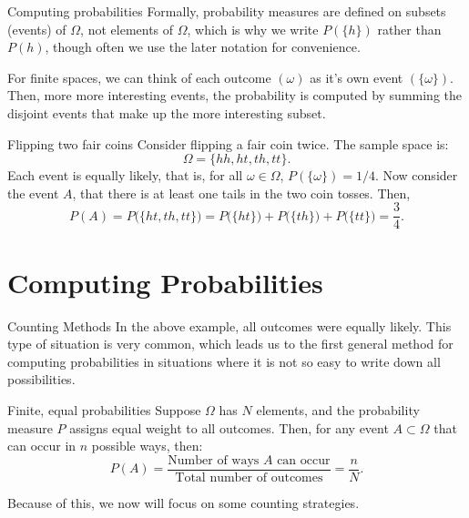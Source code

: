 \begin{frame}[allowframebreaks]{Computing probabilities}
  Formally, probability measures are defined on subsets (events) of $\Omega$, not elements of $\Omega$, which is why we write $P(\{h\})$ rather than $P(h)$, though often we use the later notation for convenience.
  
  For finite spaces, we can think of each outcome $(\omega)$ as it's own event $(\{\omega\})$. Then, more more interesting events, the probability is computed by summing the disjoint events that make up the more interesting subset.
  
  \begin{exampleblock}{Flipping two fair coins}
    Consider flipping a fair coin twice. The sample space is:
    $$
    \Omega = \{hh, ht, th, tt\}.
    $$
    Each event is equally likely, that is, for all $\omega \in \Omega$, $P(\{\omega\}) = 1/4$. Now consider the event $A$, that there is at least one tails in the two coin tosses. Then, 
    $$
    P(A) = P\big(\{ht, th, tt\}\big) = P\big(\{ht\}\big) + P\big(\{th\}\big) + P\big(\{tt\}\big) = \frac{3}{4}.
    $$
  \end{exampleblock}
\end{frame}

\section{Computing Probabilities}

\begin{frame}{Counting Methods}
  In the above example, all outcomes were equally likely. This type of situation is very common, which leads us to the first general method for computing probabilities in situations where it is not so easy to write down all possibilities.
  \begin{block}{Finite, equal probabilities}
    Suppose $\Omega$ has $N$ elements, and the probability measure $P$ assigns equal weight to all outcomes. Then, for any event $A \subset \Omega$ that can occur in $n$ possible ways, then:
    $$
    P(A) = \frac{\text{Number of ways } A \text{ can occur}}{\text{Total number of outcomes}} = \frac{n}{N}.
    $$
  \end{block}
  
  Because of this, we now will focus on some counting strategies.
  
\end{frame}

